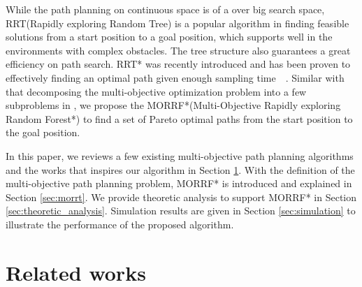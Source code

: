 \documentclass[conference]{IEEEtran}
\begin{document}
While the path planning on continuous space is of a over big search space, 
RRT(Rapidly exploring Random Tree) is a popular algorithm in finding feasible solutions from a start position to a goal position, which supports well in the environments with complex obstacles. 
The tree structure also guarantees a great efficiency on path search.
RRT* was recently introduced and has been proven to effectively finding an optimal path given enough sampling time~\cite{Karaman:2011:SAO:2000201.2000209}~\cite{Karaman.Frazzoli:RSS10}.
Similar with that decomposing the multi-objective optimization problem into a few subproblems in \cite{4358754}, we propose the MORRF*(Multi-Objective Rapidly exploring Random Forest*) to find a set of Pareto optimal paths from the start position to the goal position.

In this paper, we reviews a few existing multi-objective path planning algorithms and the works that inspires our algorithm in Section \ref{sec:related_works}.
With the definition of the multi-objective path planning problem, MORRF* is introduced and explained in Section \ref{sec:morrt}.
We provide theoretic analysis to support MORRF* in Section \ref{sec:theoretic_analysis}.
Simulation results are given in Section \ref{sec:simulation} to illustrate the performance of the proposed algorithm.

\section{Related works}
\label{sec:related_works}
\end{document}
